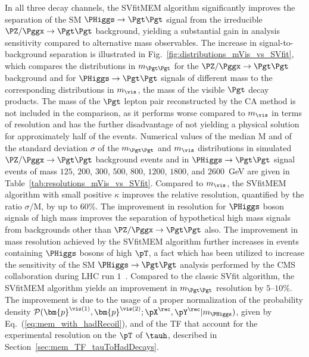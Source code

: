 In all three decay channels, the SVfitMEM algorithm significantly improves the separation of the SM $\PHiggs \to \Pgt\Pgt$ signal 
from the irreducible $\PZ/\Pggx \to \Pgt\Pgt$ background, yielding a substantial gain in analysis sensitivity
compared to alternative mass observables.
The increase in signal-to-background separation is illustrated in
Fig.~\ref{fig:distributions_mVis_vs_SVfit},
which compares the distributions in $m_{\Pgt\Pgt}$ for the $\PZ/\Pggx \to \Pgt\Pgt$ background and for $\PHiggs \to \Pgt\Pgt$ signals of different mass
to the corresponding distributions in $m_{\vis}$,
the mass of the visible $\Pgt$ decay products.
The mass of the $\Pgt$ lepton pair reconstructed by the CA method is not included in the comparison, as it performs worse compared to $m_{\vis}$ in terms of resolution
and has the further disadvantage of not yielding a physical solution
for approximately half of the events.
Numerical values of the median $\textrm{M}$ and of the standard deviation $\sigma$ 
of the $m_{\Pgt\Pgt}$ and $m_{\vis}$ distributions in simulated $\PZ/\Pggx \to \Pgt\Pgt$ background events
and in $\PHiggs \to \Pgt\Pgt$ signal events of mass $125$, $200$, $300$, $500$, $800$, $1200$, $1800$, and $2600$~GeV
are given in Table~\ref{tab:resolutions_mVis_vs_SVfit}.
Compared to $m_{\vis}$,
the SVfitMEM algorithm with small positive $\kappa$ improves the relative resolution,
quantified by the ratio $\sigma/\textrm{M}$, by up to $60\%$.
The improvement in resolution for $\PHiggs$ boson signals of high mass improves the separation of hypothetical high mass signals
from backgrounds other than $\PZ/\Pggx \to \Pgt\Pgt$ also.
The improvement in mass resolution achieved by the SVfitMEM algorithm
further increases in events
containing $\PHiggs$ bosons of high $\pT$,
a fact which has been utilized to increase the sensitivity of the SM $\PHiggs \to \Pgt\Pgt$ analysis performed by the CMS collaboration during LHC run $1$~\cite{HIG-13-004}.
Compared to the classic SVfit algorithm, the SVfitMEM algorithm yields an improvement in $m_{\Pgt\Pgt}$ resolution by $5$--$10\%$.
The improvement is due to the usage of a proper normalization of the probability density 
$\mathcal{P}(\bm{p}^{\vis(1)},\bm{p}^{\vis(2)};\pX^{\rec},\pY^{\rec}|m_{\PHiggs})$, given by Eq.~(\ref{eq:mem_with_hadRecoil}),
and of the TF that account for the experimental resolution on the $\pT$ of $\tauh$, described in Section~\ref{sec:mem_TF_tauToHadDecays}.

